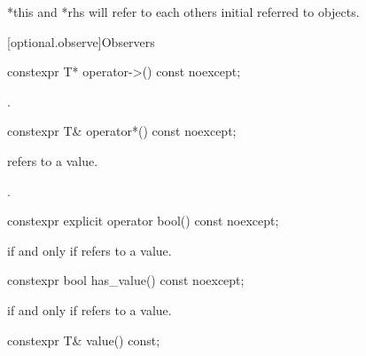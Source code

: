 \documentclass[a4paper,10pt,oneside,openany,final,article]{memoir}
\begin{document}
\begin{wording}
  \begin{itemdescr}

    \pnum
    \effects
    *this and *rhs will refer to each others initial referred to objects.

  \end{itemdescr}


  [optional.observe]{Observers}

  \begin{itemdecl}
    constexpr T* operator->() const noexcept;
  \end{itemdecl}

  \begin{itemdescr}
    \pnum
    \returns
    .
  \end{itemdescr}

  \begin{itemdecl}
    constexpr T&  operator*() const noexcept;
  \end{itemdecl}

  \begin{itemdescr}
    \pnum
    \expects
     refers to a value.

    \pnum
    \returns
    .
  \end{itemdescr}

  \begin{itemdecl}
    constexpr explicit operator bool() const noexcept;
  \end{itemdecl}

  \begin{itemdescr}
    \pnum
    \returns
     if and only if  refers to a value.
  \end{itemdescr}

  \begin{itemdecl}
    constexpr bool has_value() const noexcept;
  \end{itemdecl}

  \begin{itemdescr}
    \pnum
    \returns
     if and only if  refers to a value.
  \end{itemdescr}

  \begin{itemdecl}
    constexpr T& value() const;
  \end{itemdecl}


\end{wording}
\end{document}
